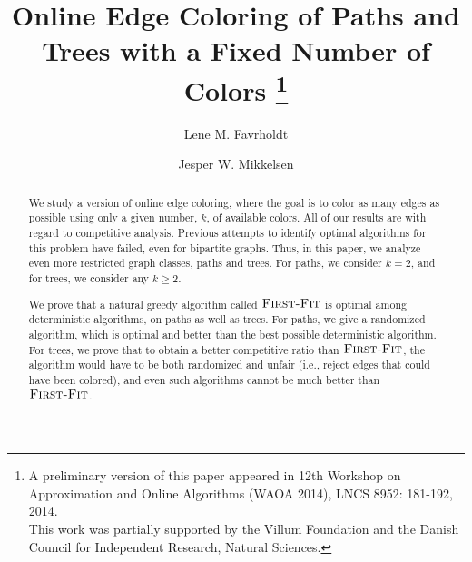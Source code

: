 \documentclass[smallextended]{svjour3}
\newcommand{\FF}{\ensuremath{\operatorname{\textsc{First-Fit}}}\xspace}
\begin{document}

\title{Online Edge Coloring of Paths and Trees with a Fixed Number of Colors \thanks{
A preliminary version of this paper appeared in 12th Workshop on Approximation and Online Algorithms (WAOA 2014), LNCS 8952: 181-192, 2014. \\This work was partially supported by the Villum Foundation and the Danish Council for Independent Research, Natural Sciences.}
}

\author{Lene M. Favrholdt         \and
        Jesper W. Mikkelsen
}


\maketitle

\begin{abstract}
We study a version of online edge coloring, where the goal is to
 color as many edges as possible using only a given number, $k$, of
 available colors.
All of our results are with regard to competitive analysis.
Previous attempts to identify optimal algorithms for this problem
 have failed, even for bipartite graphs.
Thus, in this paper, we analyze even more restricted graph classes,
 paths and trees.
For paths, we consider $k=2$, and for trees, we consider any $k \geq 2$.

We prove that a natural greedy algorithm called \FF is optimal among
 deterministic algorithms, on paths as well as trees.
For paths, we give a randomized algorithm, which is optimal and better
 than the best possible deterministic algorithm.
For trees, we prove that to obtain a better competitive ratio than
 \FF, the algorithm would have to be both randomized and
 unfair (i.e., reject  edges that could have been colored), and even
 such algorithms cannot be much better than \FF.
\end{abstract}
\end{document}
